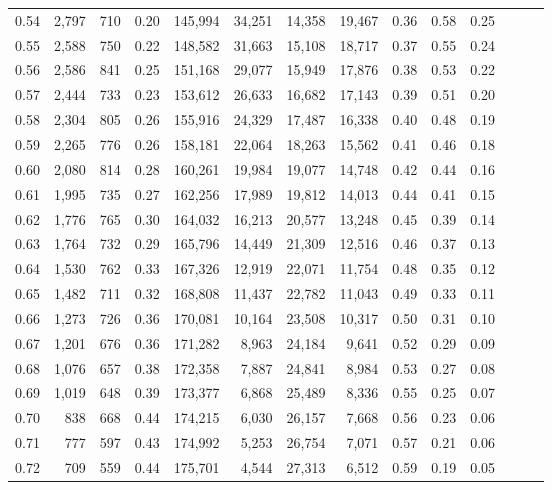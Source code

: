 \begin{tabular}{rrrrrrrrrrrrrr}
0.54 &  2,797 &  710 &  0.20 &  145,994 &   34,251 &  14,358 &  19,467 &  0.36 &  0.58 &      0.25 \\
0.55 &  2,588 &  750 &  0.22 &  148,582 &   31,663 &  15,108 &  18,717 &  0.37 &  0.55 &      0.24 \\
0.56 &  2,586 &  841 &  0.25 &  151,168 &   29,077 &  15,949 &  17,876 &  0.38 &  0.53 &      0.22 \\
0.57 &  2,444 &  733 &  0.23 &  153,612 &   26,633 &  16,682 &  17,143 &  0.39 &  0.51 &      0.20 \\
0.58 &  2,304 &  805 &  0.26 &  155,916 &   24,329 &  17,487 &  16,338 &  0.40 &  0.48 &      0.19 \\
0.59 &  2,265 &  776 &  0.26 &  158,181 &   22,064 &  18,263 &  15,562 &  0.41 &  0.46 &      0.18 \\
0.60 &  2,080 &  814 &  0.28 &  160,261 &   19,984 &  19,077 &  14,748 &  0.42 &  0.44 &      0.16 \\
0.61 &  1,995 &  735 &  0.27 &  162,256 &   17,989 &  19,812 &  14,013 &  0.44 &  0.41 &      0.15 \\
0.62 &  1,776 &  765 &  0.30 &  164,032 &   16,213 &  20,577 &  13,248 &  0.45 &  0.39 &      0.14 \\
0.63 &  1,764 &  732 &  0.29 &  165,796 &   14,449 &  21,309 &  12,516 &  0.46 &  0.37 &      0.13 \\
0.64 &  1,530 &  762 &  0.33 &  167,326 &   12,919 &  22,071 &  11,754 &  0.48 &  0.35 &      0.12 \\
0.65 &  1,482 &  711 &  0.32 &  168,808 &   11,437 &  22,782 &  11,043 &  0.49 &  0.33 &      0.11 \\
0.66 &  1,273 &  726 &  0.36 &  170,081 &   10,164 &  23,508 &  10,317 &  0.50 &  0.31 &      0.10 \\
0.67 &  1,201 &  676 &  0.36 &  171,282 &    8,963 &  24,184 &   9,641 &  0.52 &  0.29 &      0.09 \\
0.68 &  1,076 &  657 &  0.38 &  172,358 &    7,887 &  24,841 &   8,984 &  0.53 &  0.27 &      0.08 \\
0.69 &  1,019 &  648 &  0.39 &  173,377 &    6,868 &  25,489 &   8,336 &  0.55 &  0.25 &      0.07 \\
0.70 &    838 &  668 &  0.44 &  174,215 &    6,030 &  26,157 &   7,668 &  0.56 &  0.23 &      0.06 \\
0.71 &    777 &  597 &  0.43 &  174,992 &    5,253 &  26,754 &   7,071 &  0.57 &  0.21 &      0.06 \\
0.72 &    709 &  559 &  0.44 &  175,701 &    4,544 &  27,313 &   6,512 &  0.59 &  0.19 &      0.05 \\

\end{tabular}
